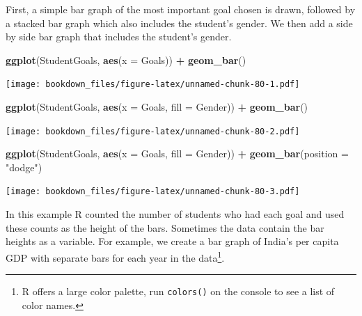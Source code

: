 \documentclass[]{krantz}
\makeatletter
\newenvironment{Shaded}{\begin{snugshade}}{\end{snugshade}}
\newcommand{\KeywordTok}[1]{\textcolor[rgb]{0.27,0.27,0.27}{\textbf{#1}}}
\newcommand{\DataTypeTok}[1]{\textcolor[rgb]{0.27,0.27,0.27}{#1}}
\newcommand{\StringTok}[1]{\textcolor[rgb]{0.5,0.5,0.5}{#1}}
\newcommand{\OperatorTok}[1]{\textcolor[rgb]{0.43,0.43,0.43}{\textbf{#1}}}
\newcommand{\NormalTok}[1]{#1}
\newenvironment{kframe}{%
\medskip{}
\setlength{\fboxsep}{.8em}
 \def\at@end@of@kframe{}%
 \ifinner\ifhmode%
  \def\at@end@of@kframe{\end{minipage}}%
  \begin{minipage}{\columnwidth}%
 \fi\fi%
 \def\FrameCommand##1{\hskip\@totalleftmargin \hskip-\fboxsep
 \colorbox{shadecolor}{##1}\hskip-\fboxsep
     \hskip-\linewidth \hskip-\@totalleftmargin \hskip\columnwidth}%
 \MakeFramed {\advance\hsize-\width
   \@totalleftmargin\z@ \linewidth\hsize
   \@setminipage}}%
 {\par\unskip\endMakeFramed%
 \at@end@of@kframe}
\renewenvironment{Shaded}{\begin{kframe}}{\end{kframe}}
\makeatother
\begin{document}
First, a simple bar graph of the most important goal chosen is drawn,
followed by a stacked bar graph which also includes the student's
gender. We then add a side by side bar graph that includes the student's
gender.

\begin{Shaded}
\begin{Highlighting}[]
\KeywordTok{ggplot}\NormalTok{(StudentGoals, }\KeywordTok{aes}\NormalTok{(}\DataTypeTok{x =}\NormalTok{ Goals)) }\OperatorTok{+}\StringTok{ }\KeywordTok{geom_bar}\NormalTok{()}
\end{Highlighting}
\end{Shaded}

\texttt{[image: bookdown\_files/figure-latex/unnamed-chunk-80-1.pdf]}

\begin{Shaded}
\begin{Highlighting}[]
\KeywordTok{ggplot}\NormalTok{(StudentGoals, }\KeywordTok{aes}\NormalTok{(}\DataTypeTok{x =}\NormalTok{ Goals, }\DataTypeTok{fill =}\NormalTok{ Gender)) }\OperatorTok{+}\StringTok{ }\KeywordTok{geom_bar}\NormalTok{()}
\end{Highlighting}
\end{Shaded}

\texttt{[image: bookdown\_files/figure-latex/unnamed-chunk-80-2.pdf]}

\begin{Shaded}
\begin{Highlighting}[]
\KeywordTok{ggplot}\NormalTok{(StudentGoals, }\KeywordTok{aes}\NormalTok{(}\DataTypeTok{x =}\NormalTok{ Goals, }\DataTypeTok{fill =}\NormalTok{ Gender)) }\OperatorTok{+}\StringTok{ }
\StringTok{    }\KeywordTok{geom_bar}\NormalTok{(}\DataTypeTok{position =} \StringTok{"dodge"}\NormalTok{)}
\end{Highlighting}
\end{Shaded}

\texttt{[image: bookdown\_files/figure-latex/unnamed-chunk-80-3.pdf]}

In this example R counted the number of students who had each goal and
used these counts as the height of the bars. Sometimes the data contain
the bar heights as a variable. For example, we create a bar graph of
India's per capita GDP with separate bars for each year in the
data\footnote{R offers a large color palette, run \texttt{colors()} on
  the console to see a list of color names.}.
\end{document}
